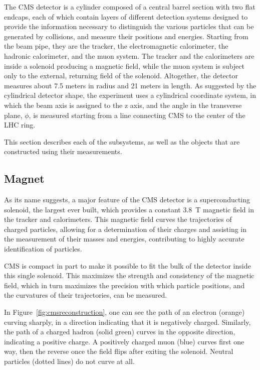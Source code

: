   The CMS detector is a cylinder composed of a central barrel section with two flat endcaps, each of which contain layers of different detection systems designed to provide the information necessary to distinguish the various particles that can be generated by collisions, and measure their positions and energies.
  Starting from the beam pipe, they are the tracker, the electromagnetic calorimeter, the hadronic calorimeter, and the muon system.
  The tracker and the calorimeters are inside a solenoid producing a magnetic field, while the muon system is subject only to the external, returning field of the solenoid.
  Altogether, the detector measures about 7.5 meters in radius and 21 meters in length.
  As suggested by the cylindrical detector shape, the experiment uses a cylindrical coordinate system, in which the beam axis is assigned to the z axis, and the angle in the transverse plane, $\phi$, is measured starting from a line connecting CMS to the center of the LHC ring.

  This section describes each of the subsystems, as well as the objects that are constructed using their measurements.

  \subsection{Magnet} \label{sec:magnet}

  As its name suggests, a major feature of the CMS detector is a superconducting solenoid, the largest ever built, which provides a constant 3.8~T magnetic field in the tracker and calorimeters.
  This magnetic field curves the trajectories of charged particles, allowing for a determination of their charges and assisting in the measurement of their masses and energies, contributing to highly accurate identification of particles.
  
  CMS is compact in part to make it possible to fit the bulk of the detector inside this single solenoid.
  This maximizes the strength and consistency of the magnetic field, which in turn maximizes the precision with which particle positions, and the curvatures of their trajectories, can be measured.

  In Figure~\ref{fig:cmsreconstruction}, one can see the path of an electron (orange) curving sharply, in a direction indicating that it is negatively charged.
  Similarly, the path of a charged hadron (solid green) curves in the opposite direction, indicating a positive charge.
  A positively charged muon (blue) curves first one way, then the reverse once the field flips after exiting the solenoid.
  Neutral particles (dotted lines) do not curve at all.

